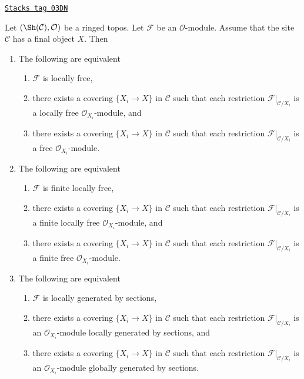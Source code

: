 \begin{lemma}
\label{sites-modules-lemma-local-final-object}
\href{https://stacks.math.columbia.edu/tag/03DN}{\texttt{Stacks tag 03DN}}

Let $(\Sh(\mathcal{C}), \mathcal{O})$
be a ringed topos. Let $\mathcal{F}$ be an $\mathcal{O}$-module.
Assume that the site $\mathcal{C}$ has a final object $X$.
Then
\begin{enumerate}
\item The following are equivalent
\begin{enumerate}
\item $\mathcal{F}$ is locally free,
\item there exists a covering $\{X_i \to X\}$ in $\mathcal{C}$ such that
each restriction $\mathcal{F}|_{\mathcal{C}/X_i}$ is a locally free
$\mathcal{O}_{X_i}$-module, and
\item there exists a covering $\{X_i \to X\}$ in $\mathcal{C}$ such that
each restriction $\mathcal{F}|_{\mathcal{C}/X_i}$ is a free
$\mathcal{O}_{X_i}$-module.
\end{enumerate}
\item The following are equivalent
\begin{enumerate}
\item $\mathcal{F}$ is finite locally free,
\item there exists a covering $\{X_i \to X\}$ in $\mathcal{C}$
such that each restriction $\mathcal{F}|_{\mathcal{C}/X_i}$
is a finite locally free $\mathcal{O}_{X_i}$-module, and
\item there exists a covering $\{X_i \to X\}$ in $\mathcal{C}$
such that each restriction $\mathcal{F}|_{\mathcal{C}/X_i}$
is a finite free $\mathcal{O}_{X_i}$-module.
\end{enumerate}
\item The following are equivalent
\begin{enumerate}
\item $\mathcal{F}$ is locally generated by sections,
\item there exists a covering $\{X_i \to X\}$ in $\mathcal{C}$
such that each restriction $\mathcal{F}|_{\mathcal{C}/X_i}$
is an $\mathcal{O}_{X_i}$-module locally generated by sections, and
\item there exists a covering $\{X_i \to X\}$ in $\mathcal{C}$
such that each restriction $\mathcal{F}|_{\mathcal{C}/X_i}$
is an $\mathcal{O}_{X_i}$-module globally generated by sections.
\end{enumerate}

\end{enumerate}
\end{lemma}
